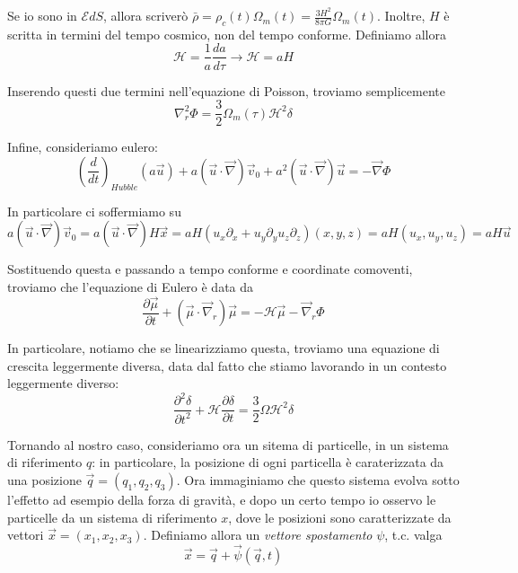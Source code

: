 \documentclass{report}
\begin{document}
Se io sono in $\mathcal{E}dS$, allora scriverò $\bar{\rho}= \rho_c(t)\Omega_m(t) = \frac{3H^2}{8\pi G}\Omega_m(t)$. Inoltre, $H$ è scritta in termini del tempo cosmico, non del tempo conforme. Definiamo allora 
\begin{equation}
    \mathcal{H} = \frac{1}{a}\frac{da}{d\tau} \rightarrow \mathcal{H} = aH
\end{equation}

Inserendo questi due termini nell'equazione di Poisson, troviamo semplicemente
\begin{equation}
    \nabla^2_r \Phi = \frac{3}{2}\Omega_m(\tau)\mathcal{H}^2\delta
\end{equation}

Infine, consideriamo eulero: 
\begin{equation}
    \left(\frac{d}{dt}\right)_{Hubble} (a\vec{u}) + a(\vec{u}\cdot \vec{\nabla})\vec{v}_0 + a^2(\vec{u}\cdot \vec{\nabla})\vec{u} = -\vec{\nabla}\Phi
\end{equation}

In particolare ci soffermiamo su 
\begin{equation}
    a(\vec{u}\cdot \vec{\nabla})\vec{v}_0 = a(\vec{u}\cdot \vec{\nabla})H\vec{x} = aH \left(u_x\partial_x + u_y\partial_y  u_z\partial_z\right) (x, y, z ) = aH(u_x, u_y, u_z) = aH\vec{u}
\end{equation}

Sostituendo questa e passando a tempo conforme e coordinate comoventi, troviamo che l'equazione di Eulero è data da
\begin{equation}
    \frac{\partial \vec{\mu}}{\partial t} + (\vec{\mu}\cdot \vec{\nabla}_r)\vec{\mu} = -\mathcal{H}\vec{\mu} - \vec{\nabla}_r\Phi
\end{equation}

In particolare, notiamo che se linearizziamo questa, troviamo una equazione di crescita leggermente diversa, data dal fatto che stiamo lavorando in un contesto leggermente diverso: 
\begin{equation}
    \frac{\partial^2 \delta}{\partial t^2} + \mathcal{H}\frac{\partial \delta}{\partial t} = \frac{3}{2}\Omega \mathcal{H}^2 \delta
\end{equation}

Tornando al nostro caso, consideriamo ora un sitema di particelle, in un sistema di riferimento $q$: in particolare, la posizione di ogni particella è caraterizzata da una posizione $\vec{q} = (q_1, q_2, q_3)$. Ora immaginiamo che questo sistema evolva sotto l'effetto ad esempio della forza di gravità, e dopo un certo tempo io osservo le particelle da un sistema di riferimento $x$, dove le posizioni sono caratterizzate da vettori $\vec{x} = (x_1, x_2, x_3)$. Definiamo allora un \emph{vettore spostamento} $\psi$, t.c. valga
\begin{equation}
    \vec{x} = \vec{q} + \vec{\psi}(\vec{q}, t)
\end{equation}
\end{document}
